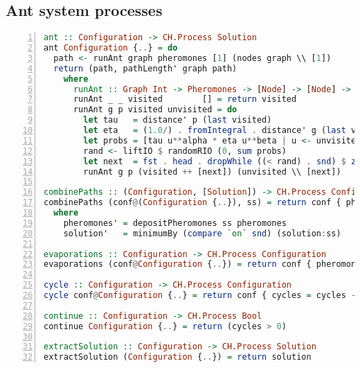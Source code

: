 \begin{landscape}
\section{Ant system processes}
\label{app:ant_system_processes}

\begin{lstlisting}[language=Haskell,frame=tb,numbers=left,caption=Implementation of basic processes for the ant system., basicstyle=\footnotesize\ttfamily]
ant :: Configuration -> CH.Process Solution
ant Configuration {..} = do
  path <- runAnt graph pheromones [1] (nodes graph \\ [1])
  return (path, pathLength' graph path)
    where
      runAnt :: Graph Int -> Pheromones -> [Node] -> [Node] -> CH.Process Path
      runAnt _ _ visited        [] = return visited
      runAnt g p visited unvisited = do
        let tau   = distance' p (last visited)
        let eta   = (1.0/) . fromIntegral . distance' g (last visited)
        let probs = [tau u**alpha * eta u**beta | u <- unvisited]
        rand <- liftIO $ randomRIO (0, sum probs)
        let next  = fst . head . dropWhile ((< rand) . snd) $ zip unvisited (scanl1 (+) probs)
        runAnt g p (visited ++ [next]) (unvisited \\ [next])

combinePaths :: (Configuration, [Solution]) -> CH.Process Configuration
combinePaths (conf@(Configuration {..}), ss) = return conf { pheromones = pheromones', solution = solution' }
  where
    pheromones' = depositPheromones ss pheromones
    solution'   = minimumBy (compare `on` snd) (solution:ss)

evaporations :: Configuration -> CH.Process Configuration
evaporations (conf@Configuration {..}) = return conf { pheromones = evaporation rho pheromones }

cycle :: Configuration -> CH.Process Configuration
cycle conf@Configuration {..} = return conf { cycles = cycles - 1 }

continue :: Configuration -> CH.Process Bool
continue Configuration {..} = return (cycles > 0)

extractSolution :: Configuration -> CH.Process Solution
extractSolution (Configuration {..}) = return solution
\end{lstlisting}

\end{landscape}